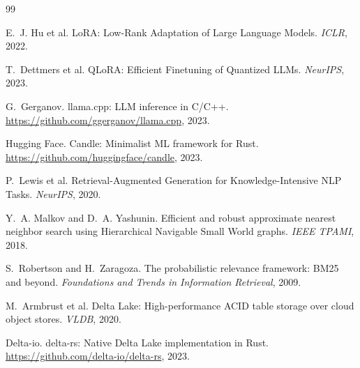 \documentclass[11pt,a4paper]{article}
\theoremstyle{plain}
\theoremstyle{definition}
\begin{document}

\begin{thebibliography}{99}

E.~J. Hu et al.
\newblock LoRA: Low-Rank Adaptation of Large Language Models.
\newblock \emph{ICLR}, 2022.

T.~Dettmers et al.
\newblock QLoRA: Efficient Finetuning of Quantized LLMs.
\newblock \emph{NeurIPS}, 2023.

G.~Gerganov.
\newblock llama.cpp: LLM inference in C/C++.
\newblock \url{https://github.com/ggerganov/llama.cpp}, 2023.

Hugging Face.
\newblock Candle: Minimalist ML framework for Rust.
\newblock \url{https://github.com/huggingface/candle}, 2023.

P.~Lewis et al.
\newblock Retrieval-Augmented Generation for Knowledge-Intensive NLP Tasks.
\newblock \emph{NeurIPS}, 2020.

Y.~A. Malkov and D.~A. Yashunin.
\newblock Efficient and robust approximate nearest neighbor search using
Hierarchical Navigable Small World graphs.
\newblock \emph{IEEE TPAMI}, 2018.

S.~Robertson and H.~Zaragoza.
\newblock The probabilistic relevance framework: BM25 and beyond.
\newblock \emph{Foundations and Trends in Information Retrieval}, 2009.

M.~Armbrust et al.
\newblock Delta Lake: High-performance ACID table storage over cloud object stores.
\newblock \emph{VLDB}, 2020.

Delta-io.
\newblock delta-rs: Native Delta Lake implementation in Rust.
\newblock \url{https://github.com/delta-io/delta-rs}, 2023.

\end{thebibliography}
\end{document}
